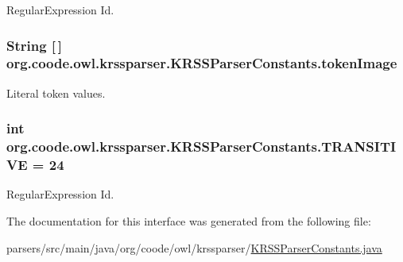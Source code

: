 Regular\-Expression Id. \hypertarget{interfaceorg_1_1coode_1_1owl_1_1krssparser_1_1_k_r_s_s_parser_constants_ae55181fdc0a59a848dc604737bdc6099}{
\subsubsection[{token\-Image}]{\setlength{\rightskip}{0pt plus 5cm}String \mbox{[}$\,$\mbox{]} org.\-coode.\-owl.\-krssparser.\-K\-R\-S\-S\-Parser\-Constants.\-token\-Image}}\label{interfaceorg_1_1coode_1_1owl_1_1krssparser_1_1_k_r_s_s_parser_constants_ae55181fdc0a59a848dc604737bdc6099}
Literal token values. \hypertarget{interfaceorg_1_1coode_1_1owl_1_1krssparser_1_1_k_r_s_s_parser_constants_a1906a01869b30f239d0b515803505284}{
\subsubsection[{T\-R\-A\-N\-S\-I\-T\-I\-V\-E}]{\setlength{\rightskip}{0pt plus 5cm}int org.\-coode.\-owl.\-krssparser.\-K\-R\-S\-S\-Parser\-Constants.\-T\-R\-A\-N\-S\-I\-T\-I\-V\-E = 24}}\label{interfaceorg_1_1coode_1_1owl_1_1krssparser_1_1_k_r_s_s_parser_constants_a1906a01869b30f239d0b515803505284}
Regular\-Expression Id. 

The documentation for this interface was generated from the following file\-:\begin{DoxyCompactItemize}
\item 
parsers/src/main/java/org/coode/owl/krssparser/\hyperlink{_k_r_s_s_parser_constants_8java}{K\-R\-S\-S\-Parser\-Constants.\-java}\end{DoxyCompactItemize}
